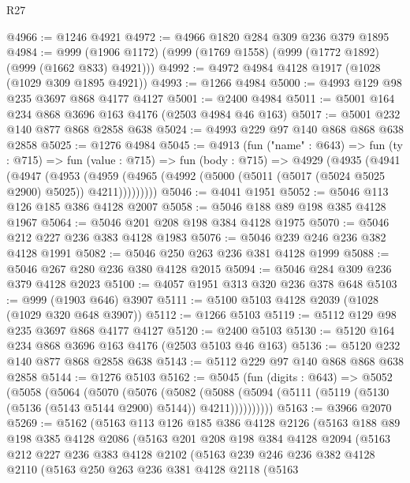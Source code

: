 \begin{lexlean}{R27}
\begin{coremodule}
@4966 := @1246 @4921
@4972 := @4966 @1820 @284 @309 @236 @379 @1895
@4984 := @999 (@1906 @1172) (@999 (@1769 @1558) (@999 (@1772 @1892) (@999 (@1662 @833) @4921)))
@4992 := @4972 @4984 @4128 @1917 (@1028 (@1029 @309 @1895 @4921))
@4993 := @1266 @4984
@5000 := @4993 @129 @98 @235 @3697 @868 @4177 @4127
@5001 := @2400 @4984
@5011 := @5001 @164 @234 @868 @3696 @163 @4176 (@2503 @4984 @46 @163)
@5017 := @5001 @232 @140 @877 @868 @2858 @638
@5024 := @4993 @229 @97 @140 @868 @868 @638 @2858
@5025 := @1276 @4984
@5045 := @4913
    (fun ("name" : @643) =>
    fun (ty : @715) =>
    fun (value : @715) =>
    fun (body : @715) =>
    @4929
      (@4935
        (@4941
          (@4947
            (@4953
              (@4959 (@4965 (@4992 (@5000 (@5011 (@5017 (@5024 @5025 @2900) @5025)) @4211)))))))))
@5046 := @4041 @1951
@5052 := @5046 @113 @126 @185 @386 @4128 @2007
@5058 := @5046 @188 @89 @198 @385 @4128 @1967
@5064 := @5046 @201 @208 @198 @384 @4128 @1975
@5070 := @5046 @212 @227 @236 @383 @4128 @1983
@5076 := @5046 @239 @246 @236 @382 @4128 @1991
@5082 := @5046 @250 @263 @236 @381 @4128 @1999
@5088 := @5046 @267 @280 @236 @380 @4128 @2015
@5094 := @5046 @284 @309 @236 @379 @4128 @2023
@5100 := @4057 @1951 @313 @320 @236 @378 @648
@5103 := @999 (@1903 @646) @3907
@5111 := @5100 @5103 @4128 @2039 (@1028 (@1029 @320 @648 @3907))
@5112 := @1266 @5103
@5119 := @5112 @129 @98 @235 @3697 @868 @4177 @4127
@5120 := @2400 @5103
@5130 := @5120 @164 @234 @868 @3696 @163 @4176 (@2503 @5103 @46 @163)
@5136 := @5120 @232 @140 @877 @868 @2858 @638
@5143 := @5112 @229 @97 @140 @868 @868 @638 @2858
@5144 := @1276 @5103
@5162 := @5045
    (fun (digits : @643) =>
    @5052
      (@5058
        (@5064
          (@5070
            (@5076
              (@5082
                (@5088
                  (@5094 (@5111 (@5119 (@5130 (@5136 (@5143 @5144 @2900) @5144)) @4211))))))))))
@5163 := @3966 @2070
@5269 := @5162
    (@5163
      @113
      @126
      @185
      @386
      @4128
      @2126
      (@5163
        @188
        @89
        @198
        @385
        @4128
        @2086
        (@5163
          @201
          @208
          @198
          @384
          @4128
          @2094
          (@5163
            @212
            @227
            @236
            @383
            @4128
            @2102
            (@5163
              @239
              @246
              @236
              @382
              @4128
              @2110
              (@5163
                @250
                @263
                @236
                @381
                @4128
                @2118
                (@5163

\end{coremodule}
\end{lexlean}
